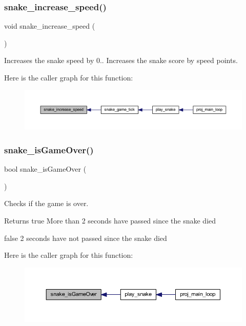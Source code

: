 \subsubsection{\texorpdfstring{snake\+\_\+increase\+\_\+speed()}{snake\_increase\_speed()}}
{\footnotesize\ttfamily void snake\+\_\+increase\+\_\+speed (\begin{DoxyParamCaption}{ }\end{DoxyParamCaption})}



Increases the snake speed by 0.. Increases the snake score by speed points. 

Here is the caller graph for this function\+:\nopagebreak
\begin{figure}[H]
\begin{center}
\leavevmode
\includegraphics[width=350pt]{group__snake_gac8f7c40125feaa0d1e72d6a032882f49_icgraph}
\end{center}
\end{figure}
\mbox{\label{group__snake_gad811f495494285ab98c9b22080829668}} 
\subsubsection{\texorpdfstring{snake\+\_\+is\+Game\+Over()}{snake\_isGameOver()}}
{\footnotesize\ttfamily bool snake\+\_\+is\+Game\+Over (\begin{DoxyParamCaption}{ }\end{DoxyParamCaption})}



Checks if the game is over. 

\begin{DoxyReturn}{Returns}
true More than 2 seconds have passed since the snake died 

false 2 seconds have not passed since the snake died 
\end{DoxyReturn}
Here is the caller graph for this function\+:\nopagebreak
\begin{figure}[H]
\begin{center}
\leavevmode
\includegraphics[width=350pt]{group__snake_gad811f495494285ab98c9b22080829668_icgraph}
\end{center}
\end{figure}
\mbox{\label{group__snake_ga18a5d5f3ad1a2a71338cf50900d6169e}} 
